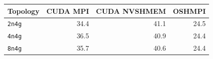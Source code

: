 \begin{tabular}{lrrr}
\toprule
Topology & CUDA MPI & CUDA NVSHMEM & OSHMPI\\
\midrule
\texttt{2n4g} & 34.4 & 41.1 & 24.5\\
\texttt{4n4g} & 36.5 & 40.9 & 24.4\\
\texttt{8n4g} & 35.7 & 40.6 & 24.4\\
\bottomrule
\end{tabular}
